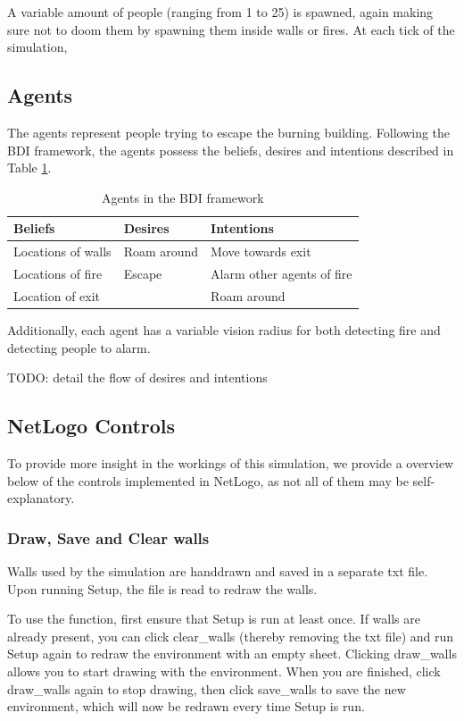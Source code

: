 \documentclass[a4paper]{article}
\begin{document}
A variable amount of people (ranging from 1 to 25) is spawned, again making sure
not to doom them by spawning them inside walls or fires. At each tick of the
simulation, 

\subsection{Agents}
The agents represent people trying to escape the burning building.
Following the BDI framework, the agents possess the beliefs, desires and
intentions described in Table \ref{tbl:bdi}.
\begin{table}[h!]
  \centering
  \begin{tabular}{lll}
    \toprule
    Beliefs & Desires & Intentions \\
    \midrule
    Locations of walls & Roam around & Move towards exit \\
    Locations of fire & Escape & Alarm other agents of fire \\
    Location of exit & & Roam around \\
    \bottomrule
  \end{tabular}
  \caption{Agents in the BDI framework}
  \label{tbl:bdi}
\end{table}

Additionally, each agent has a variable vision radius for both detecting fire
and detecting people to alarm.

TODO: detail the flow of desires and intentions

\subsection{NetLogo Controls}
To provide more insight in the workings of this simulation, we provide a overview below of the controls implemented in NetLogo, as not all of them may be self-explanatory.

\subsubsection{Draw, Save and Clear walls}
Walls used by the simulation are handdrawn and saved in a separate txt file. Upon running Setup, the file is read to redraw the walls.

To use the function, first ensure that Setup is run at least once. If walls are already present, you can click clear\_walls (thereby removing the txt file) and run Setup again to redraw the environment with an empty sheet. Clicking draw\_walls allows you to start drawing with the environment. When you are finished, click draw\_walls again to stop drawing, then click save\_walls to save the new environment, which will now be redrawn every time Setup is run.
\end{document}
